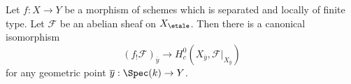 %
\begin{lemma}
\label{lemma-stalk-f-shriek-separated}
Let $f : X \to Y$ be a morphism of schemes which is separated and
locally of finite type. Let $\mathcal{F}$ be an abelian sheaf on
$X_\etale$. Then there is a canonical isomorphism
$$
(f_!\mathcal{F})_{\overline{y}}
\longrightarrow
H^0_c(X_{\overline{y}}, \mathcal{F}|_{X_{\overline{y}}})
$$
for any geometric point $\overline{y} : \Spec(k) \to Y$.
\end{lemma}

